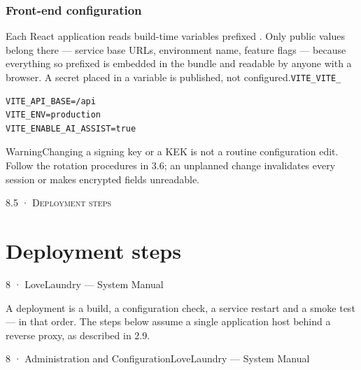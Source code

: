 \documentclass[11pt,a4paper,oneside]{book}
\begin{document}
\subsubsection*{Front-end configuration}
Each React application reads build-time variables prefixed . Only public values belong there — service base URLs, environment name, feature flags — because everything so prefixed is embedded in the bundle and readable by anyone with a browser. A secret placed in a  variable is published, not configured.\texttt{VITE\_}\texttt{VITE\_}

\begin{verbatim}
VITE_API_BASE=/api
VITE_ENV=production
VITE_ENABLE_AI_ASSIST=true
\end{verbatim}
\begin{notebox}WarningChanging a signing key or a KEK is not a routine configuration edit. Follow the rotation procedures in 3.6; an unplanned change invalidates every session or makes encrypted fields unreadable.\end{notebox}
\textsc{\small\color{crimson}8.5 · Deployment steps}\par\medskip
\section*{Deployment steps}
8 · LoveLaundry — System Manual

A deployment is a build, a configuration check, a service restart and a smoke test — in that order. The steps below assume a single application host behind a reverse proxy, as described in 2.9.

8 · Administration and ConfigurationLoveLaundry — System Manual
\end{document}
